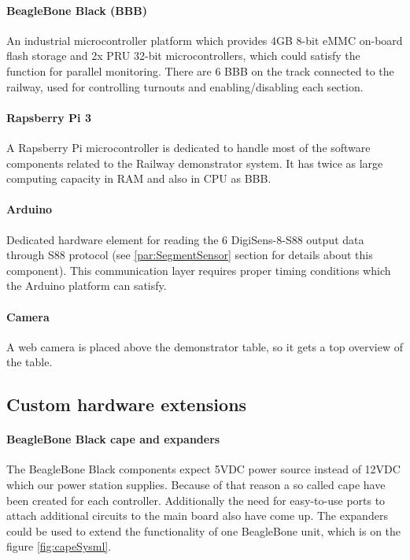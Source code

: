 \paragraph{BeagleBone Black (BBB)}
An industrial microcontroller platform which provides 4GB 8-bit eMMC on-board flash storage and 2x PRU 32-bit microcontrollers, which could satisfy the function for parallel monitoring. There are 6 BBB on the track connected to the railway, used for controlling turnouts and enabling/disabling each section.

\paragraph{Rapsberry Pi 3}
A Rapsberry Pi microcontroller is dedicated to handle most of the software components related to the Railway demonstrator system. It has twice as large computing capacity in RAM and also in CPU as BBB.

\paragraph{Arduino}
Dedicated hardware element for reading the 6 DigiSens-8-S88 output data through S88 protocol (see \ref{par:SegmentSensor} section for details about this component). This communication layer requires proper timing conditions which the Arduino platform can satisfy.

\paragraph{Camera}
A web camera is placed above the demonstrator table, so it gets a top overview of the table.

\subsection{Custom hardware extensions}\label{section:CustomHW}
\paragraph{BeagleBone Black cape and expanders}\label{par:BBBcape}
The BeagleBone Black components expect 5VDC power source instead of 12VDC which our power station supplies. Because of that reason a so called cape have been created for each controller. Additionally the need for easy-to-use ports to attach additional circuits to the main board also have come up. The expanders could be used to extend the functionality of one BeagleBone unit, which is on the figure \ref{fig:capeSysml}. 

